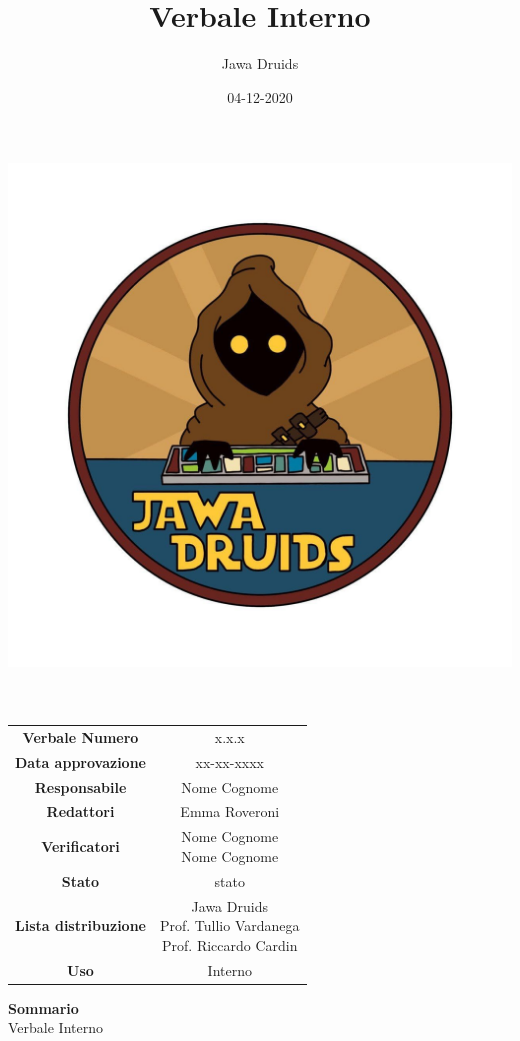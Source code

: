 \documentclass[a4paper,12pt]{report}
\begin{document}
	
	\makeatletter
	\begin{titlepage}
		\begin{center}
			\vspace*{-4,0cm}
			\author{Jawa Druids} 
			\title{Verbale Interno}
			\date{04-12-2020} %
			\includegraphics[width=0.7\linewidth]{../../immagini/DRUIDSLOGO.jpg}\\[4ex]
			{\huge \bfseries  \@title }\\[2ex] 
			{\LARGE  \@author}\\[50ex]
			\vspace*{-8,0cm}
			\begin{table}[H]
				\centering
				\begin{tabular}{c|c}
					\textbf{Verbale Numero} & x.x.x \\
					\textbf{Data approvazione} & xx-xx-xxxx\\
					\textbf{Responsabile} & Nome Cognome\\
					\textbf{Redattori} & Emma Roveroni \\
					\textbf{Verificatori} & \makecell{Nome Cognome \\ Nome Cognome} \\
					\textbf{Stato} & stato\\
					\textbf{Lista distribuzione} & \makecell{Jawa Druids \\ Prof. Tullio Vardanega \\ Prof. Riccardo Cardin }\\
					\textbf{Uso} & Interno            
				\end{tabular}
			\end{table}
			\fontsize{16}{10}\textbf{Sommario} \\
			Verbale Interno			
		\end{center}
	\end{titlepage}
\end{document}
